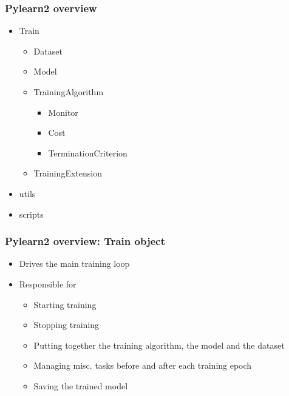 \documentclass[mathserif, xcolor=dvipsnames]{beamer}
\begin{document}
\begin{frame}
    \frametitle{Pylearn2 overview}

    \begin{itemize}\addtolength{\itemsep}{0.5\baselineskip}
        \item{
            Train
            \begin{itemize}\addtolength{\itemsep}{0.5\baselineskip}
                \item{Dataset}
                \item{Model}
                \item{
                    TrainingAlgorithm
                    \begin{itemize}\addtolength{\itemsep}{0.5\baselineskip}
                        \item{Monitor}
                        \item{Cost}
                        \item{TerminationCriterion}
                    \end{itemize}
                }
                \item{TrainingExtension}
            \end{itemize}
        }
        \item{utils}
        \item{scripts}
    \end{itemize}

\end{frame}

\begin{frame}
    \frametitle{Pylearn2 overview: \textbf{Train} object}
    \Large
    \begin{itemize}\addtolength{\itemsep}{1.0\baselineskip}
        \item{Drives the main training loop}
        \item{
            Responsible for
            \begin{itemize}\addtolength{\itemsep}{0.5\baselineskip}
                \large
                \item{Starting training}
                \item{Stopping training}
                \item{Putting together the training algorithm, the model and the
                      dataset}
                \item{Managing misc. tasks before and after each training epoch}
                \item{Saving the trained model}
            \end{itemize}
        }
    \end{itemize}

\end{frame}
\end{document}
